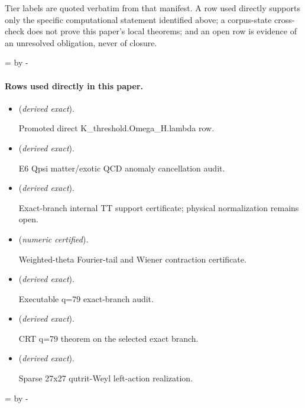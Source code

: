 \documentclass[11pt]{article}
\begin{document}
Tier labels are quoted verbatim from that manifest. A row used directly supports only the specific computational statement identified above; a corpus-state cross-check does not prove this paper's local theorems; and an open row is evidence of an unresolved obligation, never of closure.

\par\begingroup{}=\pagegoal\advance{} by -\pagetotal\ifdim\dimen0<7\baselineskip\newpage\fi\endgroup
\paragraph{Rows used directly in this paper.}
\begin{itemize}
\setlength{\itemsep}{0.25em}
\item {} (\emph{derived exact}).\par Promoted direct K\_threshold.Omega\_H.lambda row.
\item {} (\emph{derived exact}).\par E6 Qpsi matter/exotic QCD anomaly cancellation audit.
\item {} (\emph{derived exact}).\par Exact-branch internal TT support certificate; physical normalization remains open.
\item {} (\emph{numeric certified}).\par Weighted-theta Fourier-tail and Wiener contraction certificate.
\item {} (\emph{derived exact}).\par Executable q=79 exact-branch audit.
\item {} (\emph{derived exact}).\par CRT q=79 theorem on the selected exact branch.
\item {} (\emph{derived exact}).\par Sparse 27x27 qutrit-Weyl left-action realization.
\end{itemize}

\par\begingroup{}=\pagegoal\advance{} by -\pagetotal\ifdim\dimen0<7\baselineskip\newpage\fi\endgroup
\end{document}
